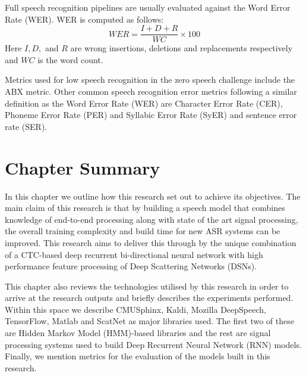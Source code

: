 Full speech recognition pipelines are usually evaluated against the Word Error Rate (WER).  WER is computed as follows:
\begin{equation}\label{eqn_2_3_wer}
WER=\frac{I+D+R}{WC}\times 100
\end{equation}
Here $I,D,$ and $R$ are wrong insertions, deletions and replacements respectively and $WC$ is the word count.

Metrics used for low speech recognition in the zero speech challenge \citep{versteegh2015zero} include the ABX metric. Other common speech recognition error metrics following a similar definition as the Word Error Rate (WER) are Character Error Rate (CER), Phoneme Error Rate (PER) and Syllabic Error Rate (SyER) and sentence error rate (SER).

\section{Chapter Summary}
In this chapter we outline how this research set out to achieve its objectives.  The main claim of this research is that by building a speech model that combines knowledge of end-to-end processing along with state of the art signal processing, the overall training complexity and build time for new ASR systems can be improved.  This research aims to deliver this through by the unique combination of a CTC-based deep recurrent bi-directional neural network with high performance feature processing of Deep Scattering Networks (DSNs).

This chapter also reviews the technologies utilised by this research in order to arrive at the research outputs and briefly describes the experiments performed.  Within this space we describe CMUSphinx, Kaldi, Mozilla DeepSpeech, TensorFlow, Matlab and ScatNet as major libraries used.   The first two of these are Hidden Markov Model (HMM)-based libraries and the rest are  signal processing systems used to build Deep Recurrent Neural Network (RNN) models. Finally, we mention metrics for the evaluation of the models built in this research.
